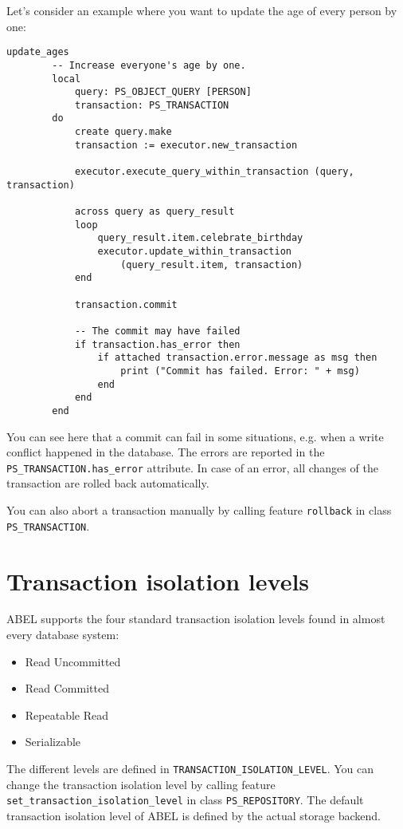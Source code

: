 \documentclass[a4paper,12pt]{report}
\begin{document}
Let's consider an example where you want to update the age of every person by one:

\begin{lstlisting}[language=OOSC2Eiffel, captionpos=b, caption={}, label={lst:update_all_ages}]
	update_ages
		-- Increase everyone's age by one.
		local
			query: PS_OBJECT_QUERY [PERSON]
			transaction: PS_TRANSACTION
		do
			create query.make
			transaction := executor.new_transaction

			executor.execute_query_within_transaction (query, transaction)

			across query as query_result
			loop
				query_result.item.celebrate_birthday
				executor.update_within_transaction 
					(query_result.item, transaction)
			end

			transaction.commit

			-- The commit may have failed
			if transaction.has_error then
				if attached transaction.error.message as msg then
					print ("Commit has failed. Error: " + msg)
				end
			end
		end
\end{lstlisting}

You can see here that a commit can fail in some situations, e.g. when a write conflict happened in the database.
The errors are reported in the \lstinline!PS_TRANSACTION.has_error! attribute.
In case of an error, all changes of the transaction are rolled back automatically.

You can also abort a transaction manually by calling feature \lstinline{rollback} in class \lstinline{PS_TRANSACTION}.

\section{Transaction isolation levels}

ABEL supports the four standard transaction isolation levels found in almost every database system:
\begin{itemize}
 \item Read Uncommitted
 \item Read Committed
 \item Repeatable Read
 \item Serializable
\end{itemize}
The different levels are defined in \lstinline!TRANSACTION_ISOLATION_LEVEL!.
You can change the transaction isolation level by calling feature\\
 \lstinline{set_transaction_isolation_level} in class \lstinline{PS_REPOSITORY}.
The default transaction isolation level of ABEL is defined by the actual storage backend.
\end{document}
